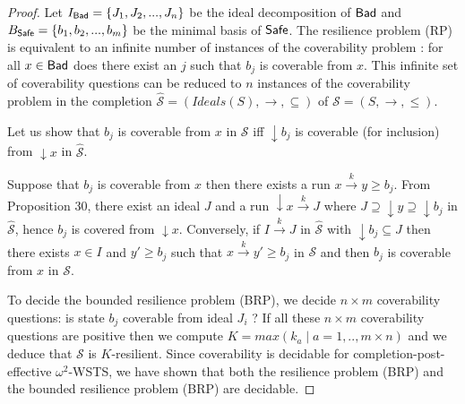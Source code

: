 \begin{proof}
Let $I_{\textsf{Bad}}=\{J_1, J_2,...,J_n\}$ be the ideal decomposition of $\textsf{Bad}$ and $B_{\textsf{Safe}}=\{b_1,b_2,...,b_m\}$ be the minimal basis of $\textsf{Safe}$.
The %
resilience problem (RP) is equivalent to an infinite number of instances of the coverability problem : for all $x \in \textsf{Bad}$ does there exist an $j$ such that $b_j$ is coverable from $x$. This infinite set of coverability questions can be reduced to $n$ instances of the coverability problem in the completion $\hat{\mathscr{S}}=(Ideals(S),\rightarrow, \subseteq)$ of $\mathscr{S}=(S,\rightarrow, \leq)$.


Let us show that $b_j$ is coverable from $x$ in $\mathscr{S}$ iff $\downarrow b_j$ is coverable (for inclusion) from $\downarrow x$ in $\hat{\mathscr{S}}$.

Suppose that $b_j$ is coverable from $x$ then there exists a run $x \xrightarrow{k} y \geq b_j$. From Proposition 30, there exist an ideal $J$ and a run $\downarrow x \xrightarrow{k} J$ where $J \supseteq \downarrow y \supseteq \downarrow b_j$ in $\hat{\mathscr{S}}$, hence $b_j$ is covered from $\downarrow x$.
Conversely, if $I \xrightarrow{k} J$ in $\hat{\mathscr{S}}$ with $\downarrow b_j \subseteq J$ then 
there exists $x \in I$ and $y' \geq b_j$ such that $x \xrightarrow{k} y'  \geq b_j$ in $\mathscr{S}$ and then $b_j$ is coverable from $x$ in $\mathscr{S}$.

%

To decide the %
 bounded resilience problem (BRP), we decide $n \times m$ coverability questions: is state $b_j$ coverable from ideal $J_i$ ? If all these $n \times m$ coverability questions are positive then we compute $K=max(k_a \mid a=1,..,m \times n)$ and we deduce that  $\mathscr{S}$ is %
  $K$-resilient. Since coverability is decidable for completion-post-effective $\omega^2$-WSTS, we have shown that both the %
  resilience problem (BRP) and the %
  bounded resilience problem (BRP) are decidable.
\end{proof}


